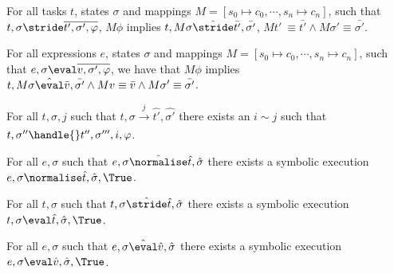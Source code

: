 \begin{lemma}
  For all tasks $t$, states $\sigma$ and mappings $M=[s_0\mapsto c_0,\cdots,s_n\mapsto c_n]$,
such that $t,\sigma\stride \overline{t',\sigma',\phi}$,
$M \phi$ implies
$t,M\sigma \hat{\stride}\bar{t'},\bar{\sigma'}$, $M t'\ \equiv \bar{t'} \land M\sigma' \equiv \bar{\sigma'}$.
\end{lemma}

\begin{lemma}
  For all expressions $e$, states $\sigma$ and mappings $M=[s_0\mapsto c_0,\cdots,s_n\mapsto c_n]$,
such that $e,\sigma\eval \overline{v,\sigma',\phi}$,
we have that $M\phi$ implies
$t,M\sigma \hat{\eval}\bar{v},\bar{\sigma'} \land Mv \equiv \bar{v} \wedge M\sigma' \equiv \bar{\sigma'}$.
\end{lemma}

\begin{lemma}
  \label{lem:completeHandle}
    For all $t,\sigma,j$ such that $t,\sigma \xrightarrow[]{j} \hat{t'},\hat{\sigma'}$
    there exists an $i\sim j$ such that $t,\sigma''\handle{} t'',\sigma''',i,\phi$.
\end{lemma}

\begin{lemma}
  \label{lem:completeNormalise}
  For all $e,\sigma$ such that $e,\sigma \hat{\normalise}\hat{t},\hat{\sigma}$
  there exists a symbolic execution $e,\sigma\normalise \hat{t},\hat{\sigma},\True$.
\end{lemma}

\begin{lemma}
  \label{lem:completeStride}
  For all $t,\sigma$ such that $t,\sigma \hat{\stride}\hat{t},\hat{\sigma}$
  there exists a symbolic execution $t,\sigma\eval \hat{t},\hat{\sigma},\True$.
\end{lemma}

\begin{lemma}
  \label{lem:completeEval}
    For all $e,\sigma$ such that $e,\sigma \hat{\eval}\hat{v},\hat{\sigma}$
    there exists a symbolic execution $e,\sigma\eval \hat{v},\hat{\sigma},\True$.
\end{lemma}


